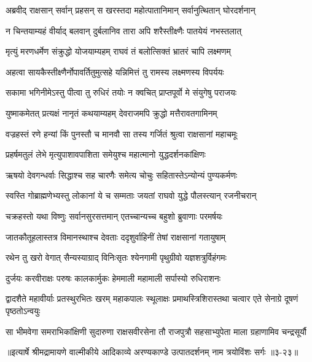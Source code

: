 \twolineshloka
{अब्रवीद् राक्षसान् सर्वान् प्रहसन् स खरस्तदा}
{महोत्पातानिमान् सर्वानुत्थितान् घोरदर्शनान्} %

\twolineshloka
{न चिन्तयाम्यहं वीर्याद् बलवान् दुर्बलानिव}
{तारा अपि शरैस्तीक्ष्णैः पातयेयं नभस्तलात्} %

\twolineshloka
{मृत्युं मरणधर्मेण संक्रुद्धो योजयाम्यहम्}
{राघवं तं बलोत्सिक्तं भ्रातरं चापि लक्ष्मणम्} %

\twolineshloka
{अहत्वा सायकैस्तीक्ष्णैर्नोपावर्तितुमुत्सहे}
{यन्निमित्तं तु रामस्य लक्ष्मणस्य विपर्ययः} %

\twolineshloka
{सकामा भगिनीमेऽस्तु पीत्वा तु रुधिरं तयोः}
{न क्वचित् प्राप्तपूर्वो मे संयुगेषु पराजयः} %

\twolineshloka
{युष्माकमेतत् प्रत्यक्षं नानृतं कथयाम्यहम्}
{देवराजमपि क्रुद्धो मत्तैरावतगामिनम्} %

\twolineshloka
{वज्रहस्तं रणे हन्यां किं पुनस्तौ च मानवौ}
{सा तस्य गर्जितं श्रुत्वा राक्षसानां महाचमूः} %

\twolineshloka
{प्रहर्षमतुलं लेभे मृत्युपाशावपाशिता}
{समेयुश्च महात्मानो युद्धदर्शनकांक्षिणः} %

\twolineshloka
{ऋषयो देवगन्धर्वाः सिद्धाश्च सह चारणैः}
{समेत्य चोचुः सहितास्तेऽन्योन्यं पुण्यकर्मणः} %

\twolineshloka
{स्वस्ति गोब्राह्मणेभ्यस्तु लोकानां ये च सम्मताः}
{जयतां राघवो युद्धे पौलस्त्यान् रजनीचरान्} %

\twolineshloka
{चक्रहस्तो यथा विष्णुः सर्वानसुरसत्तमान्}
{एतच्चान्यच्च बहुशो ब्रुवाणाः परमर्षयः} %

\twolineshloka
{जातकौतूहलास्तत्र विमानस्थाश्च देवताः}
{ददृशुर्वाहिनीं तेषां राक्षसानां गतायुषाम्} %

\twolineshloka
{रथेन तु खरो वेगात् सैन्यस्याग्राद् विनिःसृतः}
{श्येनगामी पृथुग्रीवो यज्ञशत्रुर्विहंगमः} %

\twolineshloka
{दुर्जयः करवीराक्षः परुषः कालकार्मुकः}
{हेममाली महामाली सर्पास्यो रुधिराशनः} %

\threelineshloka
{द्वादशैते महावीर्याः प्रतस्थुरभितः खरम्}
{महाकपालः स्थूलाक्षः प्रमाथस्त्रिशिरास्तथा}
{चत्वार एते सेनाग्रे दूषणं पृष्ठतोऽन्वयुः} %

\twolineshloka
{सा भीमवेगा समराभिकांक्षिणी सुदारुणा राक्षसवीरसेना}
{तौ राजपुत्रौ सहसाभ्युपेता माला ग्रहाणामिव चन्द्रसूर्यौ} %


॥इत्यार्षे श्रीमद्रामायणे वाल्मीकीये आदिकाव्ये अरण्यकाण्डे उत्पातदर्शनम् नाम त्रयोविंशः सर्गः ॥३-२३॥
